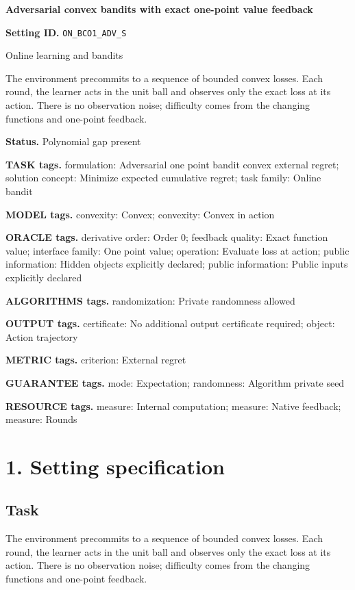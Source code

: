 \documentclass[10pt,a4paper]{article}
\begin{document}
\raggedright

{\LARGE\bfseries\sffamily\color{AtlasNavy} Adversarial convex bandits with exact one-point value feedback\par}\vspace{5pt}
\textbf{Setting ID.} \texttt{ON\_\allowbreak{}BCO1\_\allowbreak{}ADV\_\allowbreak{}S}

Online learning and bandits

The environment precommits to a sequence of bounded convex losses. Each round, the learner acts in the unit ball and observes only the exact loss at its action. There is no observation noise; difficulty comes from the changing functions and one-point feedback.

\textbf{Status.} Polynomial gap present

\textbf{TASK tags.} formulation: Adversarial one point bandit convex external regret; solution concept: Minimize expected cumulative regret; task family: Online bandit

\textbf{MODEL tags.} convexity: Convex; convexity: Convex in action

\textbf{ORACLE tags.} derivative order: Order 0; feedback quality: Exact function value; interface family: One point value; operation: Evaluate loss at action; public information: Hidden objects explicitly declared; public information: Public inputs explicitly declared

\textbf{ALGORITHMS tags.} randomization: Private randomness allowed

\textbf{OUTPUT tags.} certificate: No additional output certificate required; object: Action trajectory

\textbf{METRIC tags.} criterion: External regret

\textbf{GUARANTEE tags.} mode: Expectation; randomness: Algorithm private seed

\textbf{RESOURCE tags.} measure: Internal computation; measure: Native feedback; measure: Rounds

\section{1. Setting specification}
\subsection{Task}
The environment precommits to a sequence of bounded convex losses. Each round, the learner acts in the unit ball and observes only the exact loss at its action. There is no observation noise; difficulty comes from the changing functions and one-point feedback.
\end{document}
